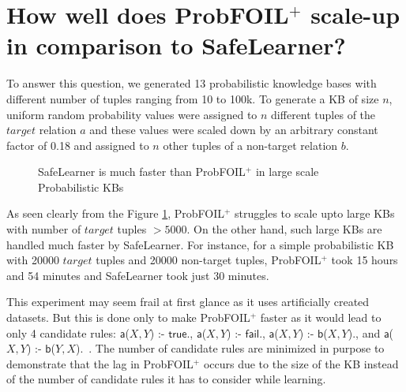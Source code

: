 \documentclass[akbc,twoside,11pt]{article}
\newcommand{\arcchit}[1]{\textcolor{red}{A: {#1}}}
\newcommand{\algorithmname}{SafeLearner\xspace}
\begin{document}
\section{How well does ProbFOIL$^+$ scale-up in comparison to \algorithmname?}\label{appendix:3}
To answer this question, we generated 13 probabilistic knowledge bases with different number of tuples ranging from 10 to 100k. To generate a KB of size $n$, uniform random probability values were assigned to $n$ different tuples of the $target$ relation $a$ and these values were scaled down by an arbitrary constant factor of 0.18 and assigned to $n$ other tuples of a non-target relation $b$. 

\begin{figure}[H]
\begin{center}
    \caption{\algorithmname is much faster than ProbFOIL$^+$ in large scale Probabilistic KBs}\label{fig:scaleup}
\end{center}
\end{figure}

As seen clearly from the Figure \ref{fig:scaleup}, ProbFOIL$^+$ struggles to scale upto large KBs with number of $target$ tuples $> 5000$. On the other hand, such large KBs are handled much faster by \algorithmname. For instance, for a simple probabilistic KB with 20000 $target$ tuples and 20000 non-target tuples, ProbFOIL$^+$ took 15 hours and 54 minutes and \algorithmname took just 30 minutes. 

This experiment may seem frail at first glance as it uses artificially created datasets. But this is done only to make ProbFOIL$^+$ faster as it would lead to only 4 candidate rules: $\mathsf{a}$($X, Y$) :- $\mathsf{true}$., $\mathsf{a}$($X, Y$) :- $\mathsf{fail}$., $\mathsf{a}$($X, Y$) :- $\mathsf{b}$($X, Y$)., and $\mathsf{a}$($X, Y$) :- $\mathsf{b}$($Y, X$).\ . The number of candidate rules are minimized in purpose to demonstrate that the lag in ProbFOIL$^+$ occurs due to the size of the KB instead of the number of candidate rules it has to consider while learning.
\end{document}
